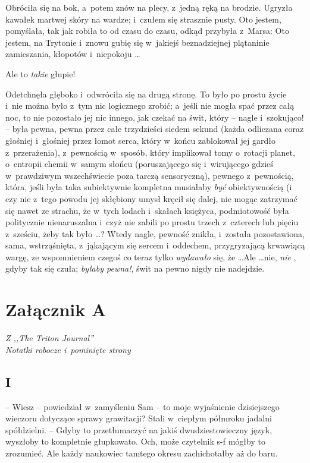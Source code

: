 \documentclass[oneside,polish,11pt,rmheadings]{mwbk}
\begin{document}
Obróciła się na bok, a~potem znów na plecy, z~jedną ręką na brodzie. Ugryzła kawałek martwej skóry na wardze; i~czułem się strasznie pusty. Oto jestem, pomyślała, tak jak robiła to od czasu do czasu, odkąd przybyła z~Marsa: Oto jestem, na Trytonie i~znowu gubię się w~jakiejś beznadziejnej plątaninie zamieszania, kłopotów i~niepokoju \ldots  

Ale to \textit{takie }głupie! 

Odetchnęła głęboko i~odwróciła się na drugą stronę. To było po prostu życie i~nie można było z~tym nic logicznego zrobić; a~jeśli nie mogła spać przez całą noc, to nie pozostało jej nic innego, jak czekać na świt, który -- nagle i~szokująco! -- była pewna, pewna przez całe trzydzieści siedem sekund (każda odliczana coraz głośniej i~głośniej przez łomot serca, który w~końcu zablokował jej gardło z~przerażenia), z~pewnością w~sposób, który implikował tomy o~rotacji planet, o~entropii chemii w~samym słońcu (poruszającego się i~wirującego gdzieś w~prawdziwym wszechświecie poza tarczą sensoryczną), pewnego z~pewnością, która, jeśli była taka subiektywnie kompletna musiałaby \textit{być }obiektywnością (i czy nie z~tego powodu jej skłębiony umysł kręcił się dalej, nie mogąc zatrzymać się nawet ze strachu, że w~tych lodach i~skałach księżyca, podmiotowość była politycznie nienaruszalna i~czyż nie zabili po prostu trzech z~czterech lub pięciu z~sześciu, żeby tak było \ldots ? Wtedy nagle, pewność znikła, i~została pozostawiona, sama, wstrząśnięta, z~jąkającym się sercem i~oddechem, przygryzającą krwawiącą wargę, ze wspomnieniem czegoś co teraz tylko \textit{wydawało }się, że  \ldots  Ale \ldots  nie, \textit{nie }, gdyby tak się czuła; \textit{byłaby pewna!}, świt na pewno nigdy nie nadejdzie. 


\chapter*{Załącznik A}

\begin{center}
\textit{Z ,,The Triton Journal'' \\ Notatki robocze i~pominięte strony }
\end{center}

\section*{I}

-- Wiesz -- powiedział w~zamyśleniu Sam -- to moje wyjaśnienie dzisiejszego wieczoru dotyczące sprawy grawitacji? Stali w~ciepłym półmroku jadalni spółdzielni. -- Gdyby to przetłumaczyć na jakiś dwudziestowieczny język, wyszłoby to kompletnie głupkowato. Och, może czytelnik s-f mógłby to zrozumieć. Ale każdy naukowiec tamtego okresu zachichotałby aż do baru. 
\end{document}
